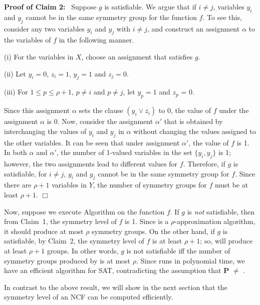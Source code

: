 \noindent
\textbf{Proof of Claim 2:}~ Suppose $g$ is satisfiable.
We argue that if $i \neq j$, variables $y_i$ and $y_j$
cannot be in the same symmetry group for the function $f$.
To see this, consider any two variables $y_i$ and $y_j$ with $i \neq j$,
and construct an assignment $\alpha$ to
the variables of $f$ in the following manner.
\begin{description}
\item{(i)} For the variables in $X$, choose an assignment that
satisfies $g$.
\item{(ii)} Let $y_i = 0$, $z_i = 1$, $y_j = 1$ and $z_j = 0$.
\item{(iii)} For $1 \leq p \leq \rho+1$, $p \neq i$ and $p \neq j$,
let $y_p = 1$ and $z_p$ = 0.
\end{description}
Since this assignment $\alpha$ sets the clause $(y_i \vee \overline{z_i})$ to 0,
the value of $f$ under the assignment $\alpha$ is 0.
Now, consider the assignment $\alpha'$ that is obtained by interchanging
the values of $y_i$ and $y_j$ in $\alpha$ without changing the
values assigned to the other variables. 
It can be seen that under assignment $\alpha'$, the value of $f$ is 1.
In both $\alpha$ and $\alpha'$, the number of 1-valued variables in 
the set $\{y_i, y_j\}$ is 1; however, the two assignments lead to 
different values for $f$.
Therefore, if $g$ is satisfiable, for $i \neq j$, $y_i$ and $y_j$ cannot
be in the same symmetry group for $f$.
Since there are $\rho+1$ variables in $Y$, the number of symmetry groups 
for $f$ must be at least $\rho+1$. \hfill$\Box$

\medskip
 
Now, suppose we execute Algorithm \cala{} on the function $f$.
If $g$ is \emph{not} satisfiable, then from Claim~1, 
the symmetry level of $f$ is 1. 
Since \cala{} is a $\rho$-approximation algorithm,
it should produce at most $\rho$ symmetry groups.
On the other hand, if $g$ is satisfiable, by Claim~2, the symmetry
level of $f$ is at least $\rho+1$; so, \cala{} will produce at least
$\rho+1$ groups.
In other words, $g$ is not satisfiable iff the number
of symmetry groups produced by \cala{} is at most $\rho$.
Since \cala{} runs in polynomial time, we have an efficient 
algorithm for SAT, contradicting the assumption that 
\textbf{P} $\neq$ \cnp.  \QED

\medskip

In contrast to the above result,
we will show in the next section that the symmetry level 
of an NCF can be computed efficiently.
